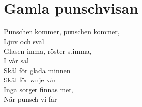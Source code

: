 \section{Gamla punschvisan}
Punschen kommer, punschen kommer,\\
Ljuv och sval\\
Glasen imma, röster stimma,\\
I vår sal\\
Skål för glada minnen\\
Skål för varje vår\\
Inga sorger finnas mer,\\
När punsch vi får\\
